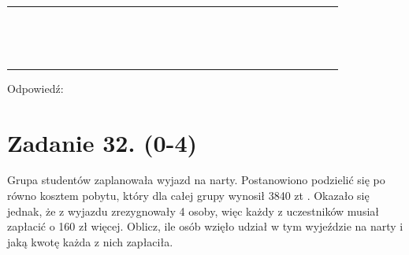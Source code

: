 \documentclass[10pt]{article}
\begin{document}
\begin{center}
\begin{tabular}{|c|c|c|c|c|c|c|c|c|c|c|c|c|c|c|c|c|c|c|c|c|c|c|c|c|c|c|c|c|c|}
\hline
 &  &  &  &  &  &  &  &  &  &  &  &  &  &  &  &  &  &  &  &  &  &  &  &  &  &  &  &  &  \\
\hline
 &  &  &  &  &  &  &  &  &  &  &  &  &  &  &  &  &  &  &  &  &  &  &  &  &  &  &  &  &  \\
\hline
 &  &  &  &  &  &  &  &  &  &  &  &  &  &  &  &  &  &  &  &  &  &  &  &  &  &  &  &  &  \\
\hline
 &  &  &  &  &  &  &  &  &  &  &  &  &  &  &  &  &  &  &  &  &  &  &  &  &  &  &  &  &  \\
\hline
 &  &  &  &  &  &  &  &  &  &  &  &  &  &  &  &  &  &  &  &  &  &  &  &  &  &  &  &  &  \\
\hline
 &  &  &  &  &  &  &  &  &  &  &  &  &  &  &  &  &  &  &  &  &  &  &  &  &  &  &  &  &  \\
\hline
 &  &  &  &  &  &  &  &  &  &  &  &  &  &  &  &  &  &  &  &  &  &  &  &  &  &  &  &  &  \\
\hline
 &  &  &  &  &  &  &  &  &  &  &  &  &  &  &  &  &  &  &  &  &  &  &  &  &  &  &  &  &  \\
\hline
 &  &  &  &  &  &  &  &  &  &  &  &  &  &  &  &  &  &  &  &  &  &  &  &  &  &  &  &  &  \\
\hline
 &  &  &  &  &  &  &  &  &  &  &  &  &  &  &  &  &  &  &  &  &  &  &  &  &  &  &  &  &  \\
\hline
 &  &  &  &  &  &  &  &  &  &  &  &  &  &  &  &  &  &  &  &  &  &  &  &  &  &  &  &  &  \\
\hline
 &  &  &  &  &  &  &  &  &  &  &  &  &  &  &  &  &  &  &  &  &  &  &  &  &  &  &  &  &  \\
\hline
 &  &  &  &  &  &  &  &  &  &  &  &  &  &  &  &  &  &  &  &  &  &  &  &  &  &  &  &  &  \\
\hline
 &  &  &  &  &  &  &  &  &  &  &  &  &  &  &  &  &  &  &  &  &  &  &  &  &  &  &  &  &  \\
\hline
 &  &  &  &  &  &  &  &  &  &  &  &  &  &  &  &  &  &  &  &  &  &  &  &  &  &  &  &  &  \\
\hline
 &  &  &  &  &  &  &  &  &  &  &  &  &  &  &  &  &  &  &  &  &  &  &  &  &  &  &  &  &  \\
\hline
\end{tabular}
\end{center}

Odpowiedź:

\section*{Zadanie 32. (0-4)}
Grupa studentów zaplanowała wyjazd na narty. Postanowiono podzielić się po równo kosztem pobytu, który dla całej grupy wynosił 3840 zt . Okazało się jednak, że z wyjazdu zrezygnowały 4 osoby, więc każdy z uczestników musiał zapłacić o 160 zł więcej. Oblicz, ile osób wzięło udział w tym wyjeździe na narty i jaką kwotę każda z nich zapłaciła.
\end{document}
